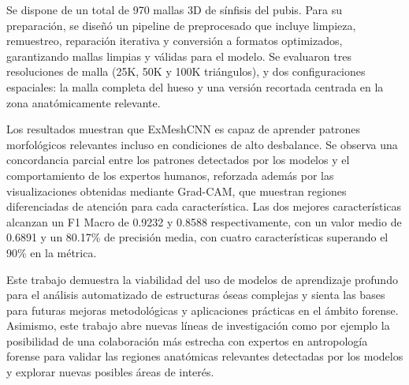 Se dispone de un total de 970 mallas 3D de sínfisis del pubis. Para su preparación, se diseñó un pipeline de preprocesado que incluye limpieza, remuestreo, reparación iterativa y conversión a formatos optimizados, garantizando mallas limpias y válidas para el modelo. Se evaluaron tres resoluciones de malla (25K, 50K y 100K triángulos), y dos configuraciones espaciales: la malla completa del hueso y una versión recortada centrada en la zona anatómicamente relevante.

Los resultados muestran que ExMeshCNN es capaz de aprender patrones morfológicos relevantes incluso en condiciones de alto desbalance. Se observa una concordancia parcial entre los patrones detectados por los modelos y el comportamiento de los expertos humanos, reforzada además por las visualizaciones obtenidas mediante Grad-CAM, que muestran regiones diferenciadas de atención para cada característica. Las dos mejores características alcanzan un F1 Macro de 0.9232 y 0.8588 respectivamente, con un valor medio de 0.6891 y un 80.17\% de precisión media, con cuatro características superando el 90\% en la métrica.

Este trabajo demuestra la viabilidad del uso de modelos de aprendizaje profundo para el análisis automatizado de estructuras óseas complejas y sienta las bases para futuras mejoras metodológicas y aplicaciones prácticas en el ámbito forense. Asimismo, este trabajo abre nuevas líneas de investigación como por ejemplo la posibilidad de una colaboración más estrecha con expertos en antropología forense para validar las regiones anatómicas relevantes detectadas por los modelos y explorar nuevas posibles áreas de interés.

\newpage
\thispagestyle{empty}


\begin{center}
{\large\bfseries \myTitleENG} \\
\end{center}
\begin{center}
\myName \\
\end{center}

\vspace{0.7cm}
 \\

\vspace{0.7cm}
 \\

